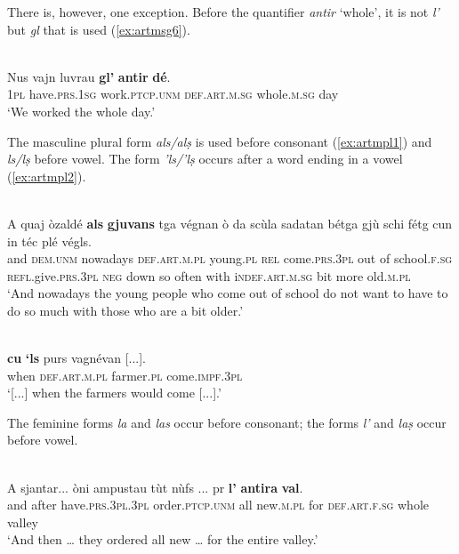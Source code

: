 There is, however, one exception. Before the quantifier \textit{antir} `whole', it is not \textit{l'} but \textit{gl} that is used (\ref{ex:artmsg6}).

\ea\label{ex:artmsg6}
\\
\gll  Nus vajn luvrau \textbf{gl'} \textbf{antir} \textbf{dé}.  \\
\textsc{1pl} have.\textsc{prs.1sg} work.\textsc{ptcp.unm} \textsc{def.art.m.sg} whole.\textsc{m.sg} day\\
\glt `We worked the whole day.'
\z

The masculine plural form \textit{als/alṣ} is used before consonant (\ref{ex:artmpl1}) and \textit{ls/lṣ} before vowel. The form \textit{'ls/'lṣ} occurs after a word ending in a vowel (\ref{ex:artmpl2}).

\ea
\label{ex:artmpl1}
\\
\gll A quaj òzaldé \textbf{als} \textbf{gjuvans} tga végnan ò da scùla sadatan bétga gjù schi fétg cun in téc plé végls.   \\
and \textsc{dem.unm} nowadays \textsc{def.art.m.pl} young.\textsc{pl} \textsc{rel} come.\textsc{prs.3pl} out of school.\textsc{f.sg} \textsc{refl}.give.\textsc{prs.3pl} \textsc{neg} down so often with i\textsc{ndef.art.m.sg} bit more old.\textsc{m.pl}\\
\glt `And nowadays the young people who come out of school do not want to have to do so much with those who are a bit older.'
\z

\ea
\label{ex:artmpl2}
\\
\gll [...] \textbf{cu} \textbf{`ls} purs vagnévan [...].\\
{} when \textsc{def.art.m.pl} farmer.\textsc{pl} come.\textsc{impf.3pl}\\
\glt `[...] when the farmers would come [...].'
\z

The feminine forms \textit{la} and \textit{las} occur before consonant; the forms \textit{l'} and \textit{laṣ} occur before vowel.

\ea\label{}
\\
\gll A sjantar... òni ampustau tùt nùfs ... pr \textbf{l'} \textbf{antira} \textbf{val}.\\
and after have.\textsc{prs.3pl.3pl} order.\textsc{ptcp.unm} all new.\textsc{m.pl} {} for \textsc{def.art.f.sg} whole valley\\
\glt `And then … they ordered all new … for the entire valley.'
\z

